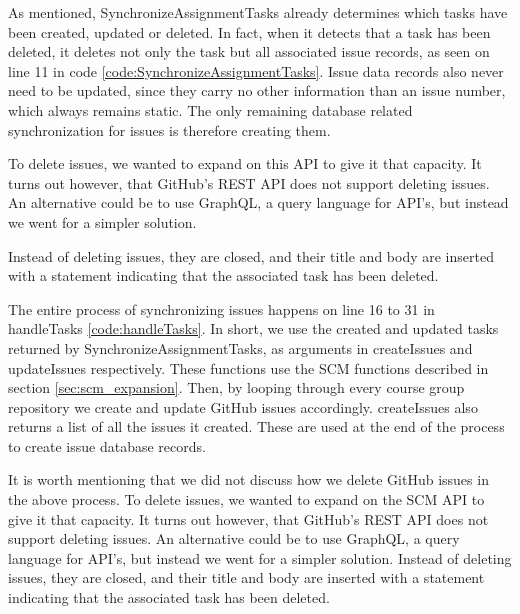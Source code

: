As mentioned, SynchronizeAssignmentTasks already determines which tasks have been created, updated or deleted.
In fact, when it detects that a task has been deleted, it deletes not only the task but all associated issue records, as seen on line 11 in code \ref{code:SynchronizeAssignmentTasks}.
Issue data records also never need to be updated, since they carry no other information than an issue number, which always remains static.
The only remaining database related synchronization for issues is therefore creating them.

To delete issues, we wanted to expand on this API to give it that capacity.
It turns out however, that GitHub's REST API does not support deleting issues.
An alternative could be to use GraphQL, a query language for API's, but instead we went for a simpler solution.

Instead of deleting issues, they are closed, and their title and body are inserted with a statement indicating that the associated task has been deleted.

The entire process of synchronizing issues happens on line 16 to 31 in handleTasks \ref{code:handleTasks}.
In short, we use the created and updated tasks returned by SynchronizeAssignmentTasks, as arguments in createIssues and updateIssues respectively.
These functions use the SCM functions described in section \ref{sec:scm_expansion}.
Then, by looping through every course group repository we create and update GitHub issues accordingly.
createIssues also returns a list of all the issues it created.
These are used at the end of the process to create issue database records.

It is worth mentioning that we did not discuss how we delete GitHub issues in the above process.
To delete issues, we wanted to expand on the SCM API to give it that capacity.
It turns out however, that GitHub's REST API does not support deleting issues.
An alternative could be to use GraphQL, a query language for API's, but instead we went for a simpler solution.
Instead of deleting issues, they are closed, and their title and body are inserted with a statement indicating that the associated task has been deleted.

